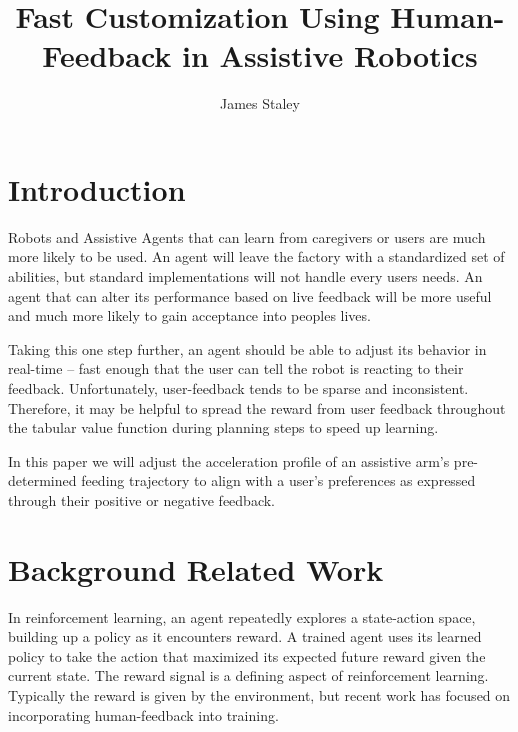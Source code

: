 \documentclass{article}
\title{Fast Customization Using Human-Feedback in Assistive Robotics}
\author{James Staley}
\date{\vspace{-1em}}
\begin{document}
\maketitle


\section{Introduction}

Robots and Assistive Agents that can learn from caregivers or users are much more likely to be used. An agent will leave the factory with a standardized set of abilities, but standard implementations will not handle every users needs. An agent that can alter its performance based on live feedback will be more useful and much more likely to gain acceptance into peoples lives. 

Taking this one step further, an agent should be able to adjust its behavior in real-time -- fast enough that the user can tell the robot is reacting to their feedback. Unfortunately, user-feedback tends to be sparse and inconsistent. Therefore, it may be helpful to spread the reward from user feedback throughout the tabular value function during planning steps to speed up learning. 

In this paper we will adjust the acceleration profile of an assistive arm's pre-determined feeding trajectory to align with a user's preferences as expressed through their positive or negative feedback. 


\section{Background Related Work}

In reinforcement learning, an agent repeatedly explores a state-action space, building up a policy as it encounters reward. A trained agent uses its learned policy to take the action that maximized its expected future reward given the current state. The reward signal is a defining aspect of reinforcement learning. Typically the reward is given by the environment, but recent work has focused on incorporating human-feedback into training. 
\end{document}
